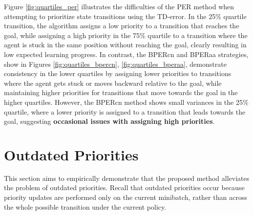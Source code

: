 Figure \ref{fig:quartiles_per} illustrates the difficulties of the PER method when attempting to prioritize state transitions using the TD-error. In the 25\% quartile transition, the algorithm assigns a low priority to a transition that reaches the goal, while assigning a high priority in the 75\% quartile to a transition where the agent is stuck in the same position without reaching the goal, clearly resulting in low expected learning progress. In contrast, the BPERcn and BPERaa strategies, show in Figures \ref{fig:quartiles_bpercn}, \ref{fig:quartiles_bperaa}, demonstrate consistency in the lower quartiles by assigning lower priorities to transitions where the agent gets stuck or moves backward relative to the goal, while maintaining higher priorities for transitions that move towards the goal in the higher quartiles. However, the BPERcn method shows small variances in the 25\% quartile, where a lower priority is assigned to a transition that leads towards the goal, suggesting \textbf{occasional issues with assigning high priorities}. 





\section{Outdated Priorities}

This section aims to empirically demonstrate that the proposed method alleviates the problem of outdated priorities. Recall that outdated priorities occur because priority updates are performed only on the current minibatch, rather than across the whole possible transition under the current policy. 


